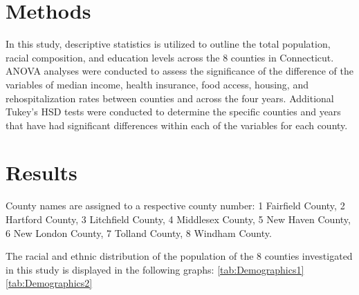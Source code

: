\documentclass[12pt]{article}
\begin{document}
\section{Methods}\label{sec:meth}

In this study, descriptive statistics is utilized to outline the total population, racial composition, 
and education levels across the 8 counties in Connecticut. ANOVA analyses were 
conducted to assess the significance of the difference of the variables of median income, health insurance, food access, housing, and rehospitalization rates between counties and across the four years. Additional 
Tukey's HSD tests were conducted to determine the specific counties and years that have had significant differences within 
each of the variables for each county.

\section{Results}\label{sec:resu}

County names are assigned to a respective county number: 
1	Fairfield County,
2	Hartford County,
3	Litchfield County,
4	Middlesex County,
5	New Haven County,
6	New London County,
7	Tolland County,
8	Windham County.

The racial and ethnic distribution of the population of the 8 counties investigated in this study is displayed in the following graphs:
\ref{tab:Demographics1}
\ref{tab:Demographics2}


\begin{table}[h]
\label{tab:Demographics1}
  \caption{Demographics and Education Levels for Counties 1-4}
\end{table}
\end{document}
